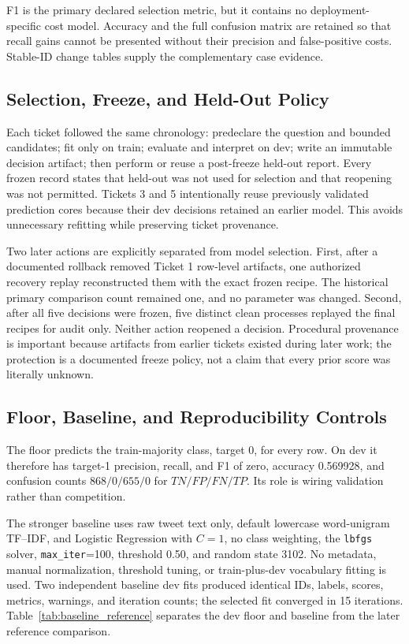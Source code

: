\documentclass[conference]{IEEEtran}
\begin{document}
F1 is the primary declared selection metric, but it contains no deployment-specific cost model. Accuracy and the full confusion matrix are retained so that recall gains cannot be presented without their precision and false-positive costs. Stable-ID change tables supply the complementary case evidence.

\subsection{Selection, Freeze, and Held-Out Policy}

Each ticket followed the same chronology: predeclare the question and bounded candidates; fit only on train; evaluate and interpret on dev; write an immutable decision artifact; then perform or reuse a post-freeze held-out report. Every frozen record states that held-out was not used for selection and that reopening was not permitted. Tickets 3 and 5 intentionally reuse previously validated prediction cores because their dev decisions retained an earlier model. This avoids unnecessary refitting while preserving ticket provenance.

Two later actions are explicitly separated from model selection. First, after a documented rollback removed Ticket 1 row-level artifacts, one authorized recovery replay reconstructed them with the exact frozen recipe. The historical primary comparison count remained one, and no parameter was changed. Second, after all five decisions were frozen, five distinct clean processes replayed the final recipes for audit only. Neither action reopened a decision. Procedural provenance is important because artifacts from earlier tickets existed during later work; the protection is a documented freeze policy, not a claim that every prior score was literally unknown.

\subsection{Floor, Baseline, and Reproducibility Controls}

The floor predicts the train-majority class, target 0, for every row. On dev it therefore has target-1 precision, recall, and F1 of zero, accuracy 0.569928, and confusion counts $868/0/655/0$ for $TN/FP/FN/TP$. Its role is wiring validation rather than competition.

The stronger baseline uses raw tweet text only, default lowercase word-unigram TF--IDF, and Logistic Regression with $C=1$, no class weighting, the \texttt{lbfgs} solver, \texttt{max\_iter}=100, threshold 0.50, and random state 3102. No metadata, manual normalization, threshold tuning, or train-plus-dev vocabulary fitting is used. Two independent baseline dev fits produced identical IDs, labels, scores, metrics, warnings, and iteration counts; the selected fit converged in 15 iterations. Table~\ref{tab:baseline_reference} separates the dev floor and baseline from the later reference comparison.
\end{document}
